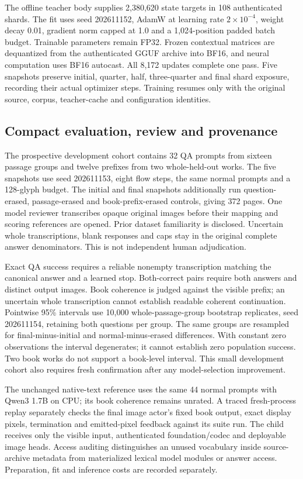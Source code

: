 \documentclass[12pt,a4paper]{article}
\begin{document}
The offline teacher body supplies 2,380,620 state targets in 108 authenticated
shards. The fit uses seed 202611152, AdamW at learning rate $2\times10^{-4}$,
weight decay 0.01, gradient norm capped at 1.0 and a 1,024-position padded
batch budget. Trainable parameters remain FP32. Frozen contextual matrices
are dequantized from the authenticated GGUF archive into BF16, and neural
computation uses BF16 autocast. All 8,172 updates complete one pass. Five snapshots preserve
initial, quarter, half, three-quarter and final shard exposure, recording
their actual optimizer steps. Training resumes only with the original source,
corpus, teacher-cache and configuration identities.

\subsection*{Compact evaluation, review and provenance}
The prospective development cohort contains 32 QA prompts from sixteen passage
groups and twelve prefixes from two whole-held-out works. The five snapshots
use seed 202611153, eight flow steps, the same normal prompts and a 128-glyph
budget. The initial and final snapshots additionally run question-erased,
passage-erased and book-prefix-erased controls, giving 372 pages. One model
reviewer transcribes opaque original images before their mapping and scoring
references are opened. Prior dataset familiarity is disclosed. Uncertain
whole transcriptions, blank responses and caps stay in the original complete
answer denominators. This is not independent human adjudication.

Exact QA success requires a reliable nonempty transcription matching the
canonical answer and a learned stop. Both-correct pairs require both answers
and distinct output images. Book coherence is judged against the visible
prefix; an uncertain whole transcription cannot establish readable coherent
continuation. Pointwise 95\% intervals use 10,000 whole-passage-group bootstrap
replicates, seed 202611154, retaining both questions per group. The same groups
are resampled for final-minus-initial and normal-minus-erased differences.
With constant zero observations the interval degenerates; it cannot establish
zero population success. Two book works do not support a book-level interval.
This small development cohort also requires fresh confirmation after any
model-selection improvement.

The unchanged native-text reference uses the same 44 normal prompts with
Qwen3 1.7B on CPU; its book coherence remains unrated. A traced fresh-process
replay separately checks the final image actor's fixed book output, exact
display pixels, termination and emitted-pixel feedback against its suite run.
The child receives only the visible input, authenticated foundation/codec and
deployable image heads. Access auditing distinguishes an unused vocabulary
inside source-archive metadata from materialized lexical model modules or
answer access. Preparation, fit and inference costs are recorded separately.
\end{document}
